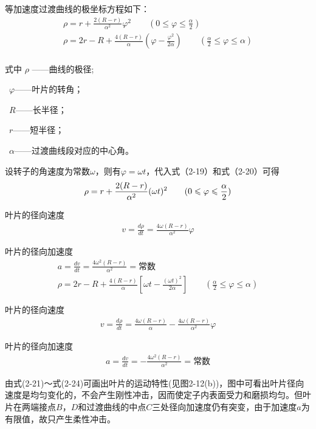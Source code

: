 \par 等加速度过渡曲线的极坐标方程如下：
\begin{gather}
\rho =r+\frac{2(R-r)}{\alpha ^2} \varphi ^2 \qquad (0\leqslant \varphi \leqslant \frac{\alpha }{2} ) \\
\rho =2r-R+\frac{4(R-r)}{\alpha } (\varphi -\frac{\varphi ^2}{2\alpha } ) \qquad (\frac{\alpha }{2} \leqslant \varphi \leqslant \alpha  )
\end{gather}
\\式中 \quad $\rho$ ——曲线的极径;
\par \quad \ $\varphi $——叶片的转角；
\par \quad \ $R$——长半径；
\par \quad \ $r$——短半径；
\par \quad \ $\alpha $——过渡曲线段对应的中心角。
\par 设转子的角速度为常数$\omega $，则有$\varphi =\omega t$，代入式（2-19）和式（2-20）可得
\begin{gather}
\rho =r+\frac{2(R-r)}{\alpha ^2} (\omega t)^2 \qquad (0\leqslant \varphi \leqslant \frac{\alpha }{2} ) \notag
\end{gather}
\par  叶片的径向速度
\begin{gather}
 v=\frac{d \rho }{d t}  =\frac{4\omega (R-r)}{\alpha ^2} \varphi 
\end{gather}
\par  叶片的径向加速度
\begin{gather}
a=\frac{dv}{dt} =\frac{4\omega ^2(R-r)}{\alpha ^2} =\mbox{常数} \\
\rho =2r-R+\frac{4(R-r)}{\alpha } [ \omega t-\frac{(\omega t)^2}{2\alpha } ]  \qquad (\frac{\alpha }{2}\leqslant \varphi \leqslant \alpha  )
\end{gather}
\par  叶片的径向速度
\begin{gather}
v=\frac{d \rho }{d t} =\frac{4\omega (R-r)}{\alpha } -\frac{4\omega (R-r)}{\alpha ^2} \varphi 
\end{gather}
\par  叶片的径向加速度
\begin{gather}
a=\frac{dv}{dt} =-\frac{4\omega ^2(R-r)}{\alpha ^2} =\mbox{常数}
\end{gather}
\par 由式(2-21)～式(2-24)可画出叶片的运动特性(见图2-12(b))，图中可看出叶片径向速度是均匀变化的，不会产生刚性冲击，因而使定子内表面受力和磨损均匀。但叶片在两端接点$B$，$D$和过渡曲线的中点$C$三处径向加速度仍有突变，由于加速度$a$为有限值，故只产生柔性冲击。

